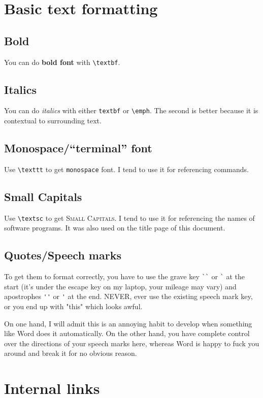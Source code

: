 \documentclass[../main]{subfiles}
\begin{document}
\section{Basic text formatting}\label{sec:basic_text}

\subsection{Bold}\label{sub:bold}
You can do \textbf{bold font} with \verb|\textbf|.

\subsection{Italics}\label{sub:emph}
You can do \emph{italics} with either \verb|textbf| or \verb|\emph|. The second is better because it is contextual to surrounding text.

\subsection{Monospace/``terminal'' font}\label{sub:tt}
Use \verb|\texttt| to get \texttt{monospace} font. I tend to use it for referencing commands.

\subsection{Small Capitals}\label{sub:sc}
Use \verb|\textsc| to get \textsc{Small Capitals}. I tend to use it for referencing the names of software programs. It was also used on the title page of this document.

\subsection{Quotes/Speech marks}\label{sub:quotes}

To get them to format correctly, you have to use the grave key \verb|``| or \verb|`| at the start (it's under the escape key on my laptop, your mileage may vary) and apostrophes \verb|''| or \verb|'| at the end. NEVER, ever use the existing speech mark key, or you end up with "this" which looks awful.

On one hand, I will admit this is an annoying habit to develop when something like Word does it automatically. On the other hand, you have complete control over the directions of your speech marks here, whereas Word is happy to fuck you around and break it for no obvious reason.

\section{Internal links}\label{sec:links}
\end{document}
